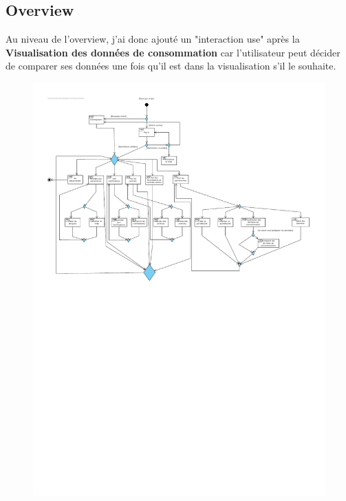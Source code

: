 \subsection{Overview}

\begin{flushleft}
Au niveau de l'overview, j'ai donc ajouté un "interaction use" après la \textbf{Visualisation des données de consommation} car l'utilisateur peut décider de comparer ses données une fois qu'il est dans la visualisation s'il le souhaite.
\end{flushleft}

\begin{figure}[h]
\centering
\includegraphics[width=1.3\textwidth]{extension-adrien/Overview/img/overview.pdf}
\end{figure}
